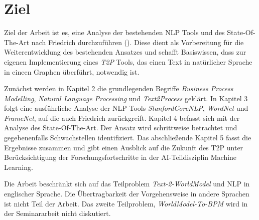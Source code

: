 \section{Ziel}

Ziel der Arbeit ist es, eine Analyse der bestehenden \ac{NLP} Tools und des State-Of-The-Art nach Friedrich durchzuführen (\cite[vgl.][]{FRIEDRICH1}). Diese dient als Vorbereitung für die Weiterentwicklung des bestehenden Ansatzes und schafft Basiswissen, dass zur eigenen Implementierung eines \textit{\ac{T2P}} Tools, das einen Text in natürlicher Sprache in eineen Graphen überführt, notwendig ist.

Zunächst werden in Kapitel 2 die grundlegenden Begriffe \textit{Business Process Modelling}, \textit{Natural Language Processing} und \textit{Text2Process} geklärt. In Kapitel 3 folgt eine ausführliche Analyse der \ac{NLP} Tools \textit{StanfordCoreNLP}, \textit{WordNet} und \textit{FrameNet}, auf die auch Friedrich zurückgreift. Kapitel 4 befasst sich mit der Analyse des State-Of-The-Art. Der Ansatz wird schrittweise betrachtet und gegebenenfalls Schwachstellen identifiziert. Das abschließende Kapitel 5 fasst die Ergebnisse zusammen und gibt einen Ausblick auf die Zukunft des \ac{T2P} unter Berücksichtigung der Forschungsfortschritte in der \ac{AI}-Teildisziplin Machine Learning.

Die Arbeit beschränkt sich auf das Teilproblem \textit{Text-2-WorldModel} und \ac{NLP} in englischer Sprache. Die Übertragbarkeit der Vorgehensweise in andere Sprachen ist nicht Teil der Arbeit. Das zweite Teilproblem, \textit{WorldModel-To-BPM} wird in der Seminararbeit nicht diskutiert.
